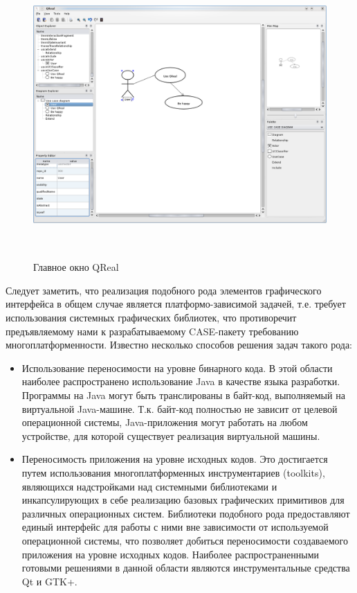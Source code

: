 \documentclass[a5paper]{article}
\begin{document}
\begin{figure} [ht]
  \begin{center}
    \includegraphics[width=14.704cm,height=10.918cm]{draft04-img1.png}
    \caption{Главное окно QReal}
    \label{mainWindow}
  \end{center}
\end{figure}


Следует заметить, что реализация подобного рода элементов графического
интерфейса в общем случае является платформо-зависимой задачей, т.е.
требует использования системных графических библиотек, что противоречит
предъявляемому нами к разрабатываемому CASE-пакету требованию
многоплатформенности. Известно несколько способов решения задач такого
рода:

\begin{itemize}
  \item Использование переносимости на уровне бинарного кода. В этой области
	наиболее распространено использование Java в
	качестве языка разработки. Программы на Java могут быть транслированы в
	байт-код, выполняемый на виртуальной Java-машине. Т.к. байт-код полностью не
	зависит от целевой операционной системы, Java-приложения могут работать
	на любом устройстве, для которой существует реализация виртуальной машины. 
  \item Переносимость приложения на уровне исходных кодов. Это достигается путем
	использования многоплатформенных инструментариев
	(toolkits), являющихся надстройками над
	системными библиотеками и инкапсулирующих в себе реализацию базовых
	графических примитивов для различных операционных систем. Библиотеки
	подобного рода предоставляют единый интерфейс для работы с ними вне
	зависимости от используемой операционной системы, что позволяет
	добиться переносимости создаваемого приложения на уровне исходных
	кодов. Наиболее распространенными готовыми решениями в данной области
	являются инструментальные средства Qt и	GTK+.
\end{itemize}
\end{document}

